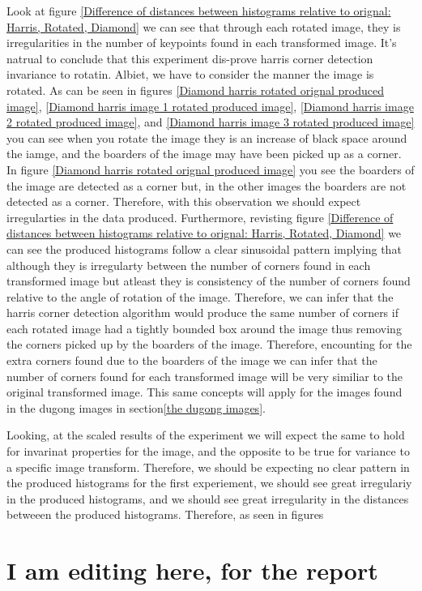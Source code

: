 \documentclass[conference]{IEEEtran}
\begin{document}
Look at figure \ref{Difference of distances between histograms relative to orignal: Harris, Rotated, Diamond} we can see that through each rotated image, they is irregularities in the number of keypoints found in each transformed image. It's natrual to conclude that this experiment dis-prove harris corner detection invariance to rotatin. Albiet, we have to consider the manner the image is rotated. As can be seen in figures \ref{Diamond harris rotated orignal produced image}, \ref{Diamond harris image 1 rotated produced image}, \ref{Diamond harris image 2 rotated produced image}, and \ref{Diamond harris image 3 rotated produced image} you can see when you rotate the image they is an increase of black space around the iamge, and the boarders of the image may have been picked up as a corner. In figure \ref{Diamond harris rotated orignal produced image} you see the boarders of the image are detected as a corner but, in the other images the boarders are not detected as a corner. Therefore, with this observation we should expect irregularties in the data produced. Furthermore, revisting figure \ref{Difference of distances between histograms relative to orignal: Harris, Rotated, Diamond} we can see the produced histograms follow a clear sinusoidal pattern implying that although they is irregularty between the number of corners found in each transformed image but atleast they is consistency of the number of corners found relative to the angle of rotation of the image. Therefore, we can infer that the harris corner detection algorithm would produce the same number of corners if each rotated image had a tightly bounded box around the image thus removing the corners picked up by the boarders of the image. Therefore, encounting for the extra corners found due to the boarders of the image we can infer that the number of corners found for each transformed image will be very similiar to the original transformed image. This same concepts will apply for the images found in the dugong images in section\ref{the dugong images}.\par

Looking, at the scaled results of the experiment we will expect the same to hold for invarinat properties for the image, and the opposite to be true for variance to a specific image transform. Therefore, we should be expecting no clear pattern in the produced histograms for the first experiement, we should see great irregulariy in the produced histograms, and we should see great irregularity in the distances betweeen the produced histograms. Therefore, as seen in figures \section{I am editing here, for the report}
\end{document}
